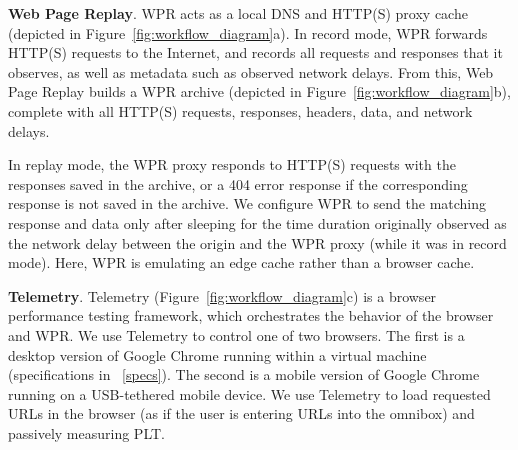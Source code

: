 \textbf{Web Page Replay}. WPR acts as a local DNS and HTTP(S) proxy cache (depicted in Figure~\ref{fig:workflow_diagram}a).
In record mode, WPR forwards HTTP(S) requests to the Internet, and records all requests and responses that it observes, as well as metadata such as observed network delays. From this, Web Page Replay builds a WPR archive (depicted in Figure~\ref{fig:workflow_diagram}b), complete with all HTTP(S) requests, responses, headers, data, and network delays. %

In replay mode, the WPR proxy responds to HTTP(S) requests with the responses saved in the archive, or a 404 error response if the corresponding response is not saved in the archive.
We configure WPR to send the matching response and data only after sleeping for the time duration originally observed as the network delay between the origin and the WPR proxy (while it was in record mode). Here, WPR is emulating an edge cache rather than a browser cache.

\textbf{Telemetry}. Telemetry (Figure~\ref{fig:workflow_diagram}c) is a browser performance testing framework, which orchestrates the behavior of the browser and WPR.
We use Telemetry to control one of two browsers. The first is a desktop version of Google Chrome running within a virtual machine (specifications in ~\ref{specs}). The second is a mobile version of Google Chrome running on a USB-tethered mobile device.
We use Telemetry to load requested URLs in the browser (as if the user is entering URLs into the omnibox) and passively measuring PLT.
